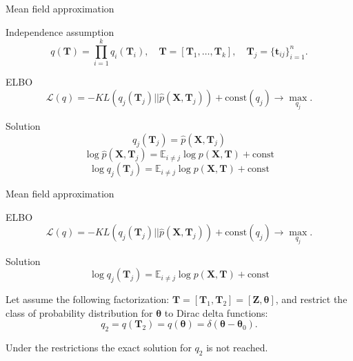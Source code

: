\documentclass{beamer}
\newcommand{\bt}{\mathbf{t}}
\newcommand{\bT}{\mathbf{T}}
\newcommand{\bX}{\mathbf{X}}
\newcommand{\bZ}{\mathbf{Z}}
\newcommand{\btheta}{\boldsymbol{\theta}}
\begin{document}
\begin{frame}{Mean field approximation}   
	 \begin{block}{Independence assumption}
		\vspace{-0.3cm}
		\[
		q(\bT) = \prod_{i=1}^k q_i(\bT_i), \quad \bT = [\bT_1, \dots, \bT_k], \quad \bT_j = \{ \bt_{ij}\}_{i=1}^n.
		\]
		\vspace{-0.3cm}
	\end{block}
	\begin{block}{ELBO}
		\vspace{-0.3cm}
	    \[
			\mathcal{L} (q) = - KL (q_j(\bT_j) || \hat{p}(\bX, \bT_j))  + \text{const}(q_j) \rightarrow \max_{q_j}.
	    \]
	    \vspace{-0.3cm}
	\end{block}
	 \begin{block}{Solution}
	 	\vspace{-0.3cm}
		 \[
		    q_j(\bT_j) = \hat{p}(\bX, \bT_j)
		 \]
		 \[
		 	\log \hat{p}(\bX, \bT_j) = \mathbb{E}_{i \neq j} \log p(\bX, \bT) + \text{const}
		 \]
		 \[
		     \log q_j(\bT_j) = \mathbb{E}_{i \neq j} \log p(\bX, \bT) + \text{const}
		 \]
		 \vspace{-0.3cm}
	 \end{block}
\end{frame}
\begin{frame}{Mean field approximation}
	\begin{block}{ELBO}
		\[
			\mathcal{L} (q) = - KL (q_j(\bT_j) || \hat{p}(\bX, \bT_j))  + \text{const}(q_j) \rightarrow \max_{q_j}.
		\]
		\vspace{-0.3cm}
	\end{block}
	\begin{block}{Solution}
		\vspace{-0.3cm}
		\[
			\log q_j(\bT_j) = \mathbb{E}_{i \neq j} \log p(\bX, \bT) + \text{const}
		\]
		\vspace{-0.3cm}
	\end{block}
	Let assume the following factorization: $\bT = [\bT_1, \bT_2] = [\bZ, \btheta]$, and restrict the class of probability distribution for $\btheta$ to Dirac delta functions:
	\[
		q_2 = q(\bT_2) = q(\btheta) = \delta(\btheta - \btheta_0).
	\]
	
	Under the restrictions the exact solution for $q_2$ is not reached.
\end{frame}
\end{document}
